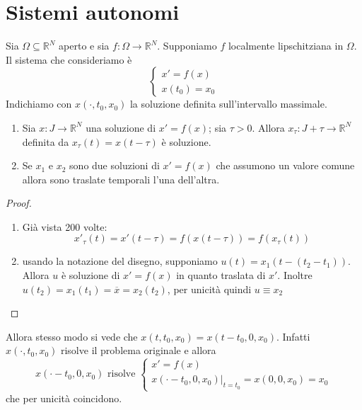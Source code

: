 \section{Sistemi autonomi}
Sia \(\Omega \subseteq \mathbb{R}^{N} \) aperto e sia \(f : \Omega \to
\mathbb{R}^{N}\). Supponiamo \(f\) localmente lipschitziana in \(\Omega\). Il
sistema che consideriamo è 
\[
    \begin{cases}
        x' = f(x) \\
        x(t_{0}) = x_{0}
    \end{cases}
\]
Indichiamo con \(x{(\cdot , t_{0}, x_{0})}\) la soluzione definita
sull'intervallo massimale.
\begin{proposition}
\begin{enumerate}[label = \arabic*.]
    \item Sia \(x : J \to \mathbb{R}^{N}\) una soluzione di \(x' = f{(x)}\); sia
    \(\tau > 0\). Allora \(x_\tau : J+\tau \to \mathbb{R}^{N}\) definita da
    \(x_\tau{(t)} = x{(t - \tau)}\) è soluzione.
\item Se \(x_{1}\) e \(x_{2}\) sono due soluzioni di \(x' = f{(x)}\) che assumono
    un valore comune allora sono traslate temporali l'una dell'altra.
\end{enumerate}
\end{proposition}
\begin{proof}
\begin{enumerate}[label = \arabic*.]
    \item Già vista 200 volte: 
        \[
            x'_\tau{(t)} = x'{(t - \tau)} = f{(x{(t-\tau)})} = f{(x_\tau{(t)})}  
        \]
\begin{figure}[ht]
    \centering
\end{figure}
    \item usando la notazione del disegno, supponiamo \(u{(t)} = x_{1}{(t -
        {(t_{2} - t_{1})})}\). Allora \(u\) è soluzione di \(x' = f{(x)}\) in
        quanto traslata di \(x'\). Inoltre \(u{(t_{2})} = x_{1}{(t_{1})} =
        \overline{x} = x_{2}{(t_{2})}\), per unicità quindi \(u \equiv x_{2}\) 
\end{enumerate}
\end{proof}
Allora stesso modo si vede che \(x{(t, t_{0}, x_{0})} = x{(t-t_{0}, 0,
x_{0})}\). Infatti \(x{(\cdot , t_{0}, x_{0})}\) risolve il problema originale e
allora
\[
    x{(\cdot - t_{0}, 0, x_{0})} \text{ risolve } \begin{cases}
        x' = f{(x)} \\
        x(\cdot - t_{0}, 0, x_{0})|_{t = t_{0}}  = x{(0, 0, x_{0})} = x_{0}
    \end{cases}
\]
che per unicità coincidono.

